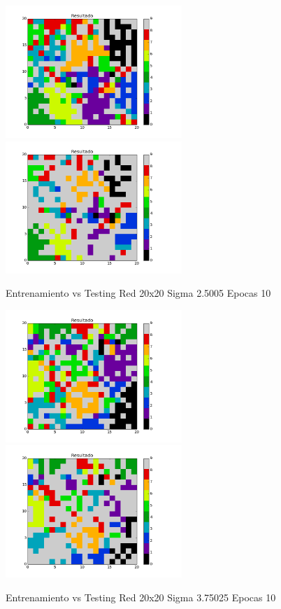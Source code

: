 \includegraphics[width=0.5\textwidth]{img/EJ2_Sigma/train_M_20_sigma_2_5005_epocas_5}
\includegraphics[width=0.5\textwidth]{img/EJ2_Sigma/test_M_20_sigma_2_5005_epocas_5}
{\center \footnotesize Entrenamiento vs Testing Red 20x20 Sigma 2.5005 Epocas 10\par}

\includegraphics[width=0.5\textwidth]{img/EJ2_Sigma/train_M_20_sigma_3_75025_epocas_5}
\includegraphics[width=0.5\textwidth]{img/EJ2_Sigma/test_M_20_sigma_3_75025_epocas_5}
{\center \footnotesize Entrenamiento vs Testing Red 20x20 Sigma 3.75025 Epocas 10\par}

